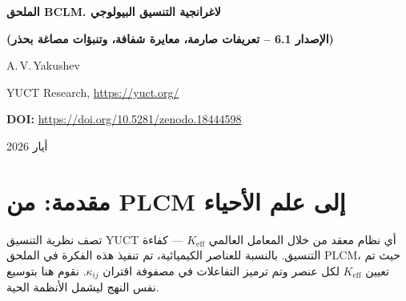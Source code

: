 \documentclass[11pt,a4paper]{article}
\newcommand{\REL}{\mathcal{K}}
\begin{document}
	
	\begin{titlepage}
		\centering
		\vspace*{2cm}
		{\Huge\bfseries الملحق BCLM. لاغرانجية التنسيق البيولوجي\par}
		\vspace{0.3cm}
		{\Large\bfseries (الإصدار 6.1 – تعريفات صارمة، معايرة شفافة، وتنبؤات مصاغة بحذر)\par}
		\vspace{1.5cm}
		{\large A.\,V.\,Yakushev\par}
		{\normalsize YUCT Research, \url{https://yuct.org/}\par}
		
		\vspace{1.0cm}
		{\normalsize \textbf{DOI:} \url{https://doi.org/10.5281/zenodo.18444598}\par}
		\vspace{1.0cm}
		{\normalsize أيار 2026\par}
		\vfill
		\begin{abstract}
			\noindent
			يقدم هذا المستند لاغرانجية التنسيق البيولوجي (BCLM) كوحدة متسقة تعتمد على البيانات من نظرية التنسيق الموحد لياكوشيف (YUCT). 
			يُعطى كل كائن بيولوجي كفاءة تنسيق نسبية \(\REL\)، تُعرف بشكل موحد من خلال بروتوكول YPSDC كنسبة الضغط \(H(\mathcal{A})/H(\kappa)\) مطبعة على الحد الأقصى النظري. 
			نقدم جداول كاملة للكودونات، الأحماض الأمينية، الإنزيمات، كفاءات الإصلاح المرتبطة بالطفرات، الثوابت التباينية، ومعاملات الخلايا العصبية. 
			قاعدة توافق جبرية عالمية، مستمدة من ثوابت YUCT ومعايرة على بيانات ارتباط البروتين-بروتين، تحكم التفاعلات بين أي كيانين بيولوجيين. 
			تمت صياغة بروتوكول الحياة الطويلة كفرضية كمية قابلة للتكذيب؛ وتُشتق تنبؤاته من قانون الخطأ العالمي والبنية الضربية للأخطاء الخلوية.
			تم استعادة الوحدات المتقدمة الرئيسية (التنسيق الزمني، المناعة، السموم، الكائنات المتعددة، الشابرونات، التعديلات ما بعد الترجمة) والتعبير عنها في إطار \(\REL\) الموحد.
			تمت مناقشة جميع التعريفات والمعايرات والقيود لضمان الدقة العلمية.
		\end{abstract}
	\end{titlepage}
	
	\tableofcontents
	\newpage
	
	\section{مقدمة: من PLCM إلى علم الأحياء}
	تصف نظرية التنسيق YUCT أي نظام معقد من خلال المعامل العالمي \(K_{\mathrm{eff}}\) — كفاءة التنسيق. بالنسبة للعناصر الكيميائية، تم تنفيذ هذه الفكرة في الملحق PLCM، حيث تم تعيين \(K_{\mathrm{eff}}\) لكل عنصر وتم ترميز التفاعلات في مصفوفة اقتران \(\kappa_{ij}\). نقوم هنا بتوسيع نفس النهج ليشمل الأنظمة الحية.
	
\end{document}
